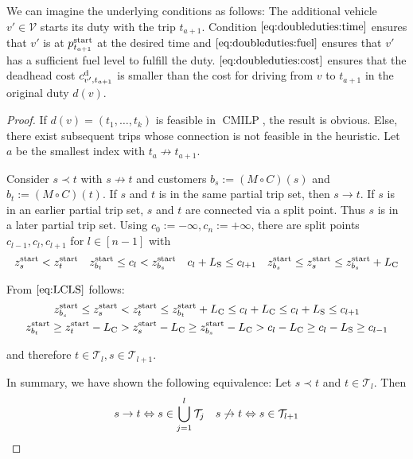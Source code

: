 We can imagine the underlying conditions as follows: The additional vehicle $v'\in\mathcal{V}$ starts its duty with the trip $t_{a+1}$. Condition $\eqref{eq:doubleduties:time}$ ensures that $v'$ is at $p^{\operatorname{start}}_{t_{a+1}}$ at the desired time and $\eqref{eq:doubleduties:fuel}$ ensures that $v'$ has a sufficient fuel level to fulfill the duty. $\eqref{eq:doubleduties:cost}$ ensures that the deadhead cost $c^{\operatorname{d}}_{v',t_{a+1}}$ is smaller than the cost for driving from $v$ to $t_{a+1}$ in the original duty $d(v)$.

\begin{proof}

If ${d(v)=\left(t_1,\dots,t_k\right)}$ is feasible in $\operatorname{CMILP}$, the result is obvious. Else, there exist subsequent trips whose connection is not feasible in the heuristic. Let $a$ be the smallest index with ${t_a\not\to t_{a+1}}$.

Consider ${s\prec t}$ with ${s\not\to t}$ and customers ${b_s:=\left(M\circ C\right)(s)}$ and ${b_t:=\left(M\circ C\right)(t)}$. If $s$ and $t$ is in the same partial trip set, then ${s\to t}$. If $s$ is in an earlier partial trip set, $s$ and $t$ are connected via a split point. Thus $s$ is in a later partial trip set. Using ${c_{0}:=-\infty}, {c_n:=+\infty}$, there are split points $c_{l-1},c_l,c_{l+1}$ for $l\in[n-1]$ with
\begin{align*}
	z^{\operatorname{start}}_s < z^{\operatorname{start}}_t && z^{\operatorname{start}}_{b_t}\leq c_l <z^{\operatorname{start}}_{b_s} && c_l+L_{\operatorname{S}}\leq c_{l+1} && z^{\operatorname{start}}_{b_s}\leq z^{\operatorname{start}}_s\leq z^{\operatorname{start}}_{b_s}+L_{\operatorname{C}}
\end{align*}

From $\eqref{eq:LCLS}$ follows:
\begin{gather*}
	z^{\operatorname{start}}_{b_s} \leq z^{\operatorname{start}}_s < z^{\operatorname{start}}_t\leq z^{\operatorname{start}}_{b_t}+L_{\operatorname{C}} \leq c_l+L_{\operatorname{C}} \leq c_l+L_{\operatorname{S}} \leq c_{l+1} \\
	z^{\operatorname{start}}_{b_t} \geq z^{\operatorname{start}}_t-L_{\operatorname{C}} > z^{\operatorname{start}}_s-L_{\operatorname{C}} \geq z^{\operatorname{start}}_{b_s}-L_{\operatorname{C}} > c_l-L_{\operatorname{C}}\geq c_l-L_{\operatorname{S}}\geq c_{l-1}
\end{gather*}

and therefore $t\in\mathcal{T}_l,s\in\mathcal{T}_{l+1}$.

In summary, we have shown the following equivalence: Let ${s\prec t}$ and ${t\in\mathcal{T}_l}$. Then
\begin{align*}
	s\to t \Leftrightarrow s\in\bigcup_{j=1}^l \mathcal{T}_j && s\not\to t \Leftrightarrow s\in\mathcal{T}_{l+1}
\end{align*}


\end{proof}
